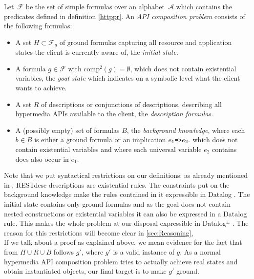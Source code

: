 \begin{definition}\label{apicomp}
Let~$\mathcal{F}$ be the set of simple \nthree formulas over an alphabet~$\mathcal{A}$ which contains the predicates defined in definition \ref{httppr}.
An \textit{API composition problem} consists of the following formulas:
\begin{itemize}
 \item A set $H\subset \mathcal{F}_g$ of ground formulas capturing all resource and application states the client is currently aware of,  the \textit{initial state}.
 \item 
 A formula $g\in \mathcal{F}$ with $\text{comp}^2(g)=\emptyset$, which does not contain existential variables, the \textit{goal state} which
  indicates on a symbolic level what the client wants to achieve.
 \item A set $R$ of
 \restdesc descriptions or conjunctions of  \restdesc descriptions, describing
 all hypermedia APIs available to the client, the \textit{description formulas}.
 
 \item 
 A (possibly empty) set of \nthree formulas $B$, the \textit{background knowledge}, 
 where each $b\in B$ is either a ground formula or an implication $e_1\verb!=>! e_2.$ %
 which does not contain existential variables and 
 where each universal variable $e_2$ contains %
does also occur in $e_1$.%
\end{itemize}
\end{definition}

Note that we put syntactical restrictions on our definitions: as already mentioned in , RESTdesc descriptions are
existential rules. The constraints put on the background knowledge make the rules contained in it expressible in Datalog \cite{datalog}. The initial state
contains only ground formulas and as the goal does not contain nested constructions or existential variables it can also be expressed in a Datalog rule.
This makes the whole problem at our disposal expressible in Datalog$^\pm$ \cite{datalogpm}. The reason for this restrictions 
will become clear in \cref{sec:Reasoning},
\\
If we talk about a proof as explained above, we mean evidence for the fact that
from $H\cup R \cup B$ follows $g'$, where $g'$ is a valid instance of $g$. 
As a normal hypermedia API composition problem tries to actually achieve real states
and obtain instantiated objects, our final target is to make $g'$ ground.

